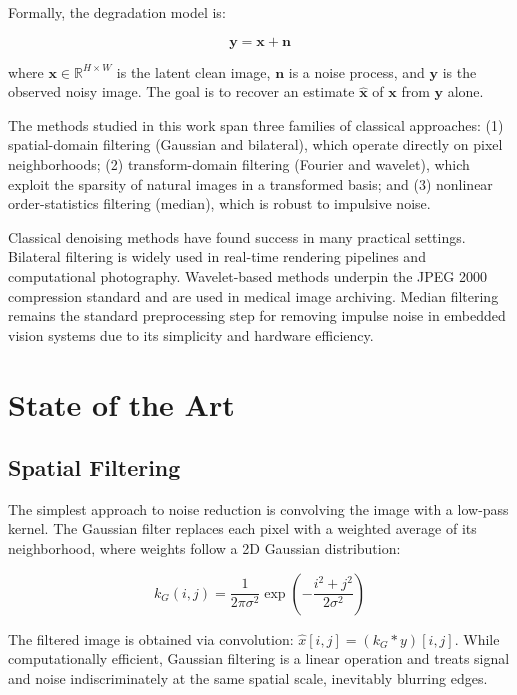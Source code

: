 \documentclass[conference]{IEEEtran}
\begin{document}
Formally, the degradation model is:

\begin{equation}
  \mathbf{y} = \mathbf{x} + \mathbf{n}
  \label{eq:degradation}
\end{equation}

where $\mathbf{x} \in \mathbb{R}^{H \times W}$ is the latent clean image, $\mathbf{n}$ is a noise process, and $\mathbf{y}$ is the observed noisy image. The goal is to recover an estimate $\hat{\mathbf{x}}$ of $\mathbf{x}$ from $\mathbf{y}$ alone.

The methods studied in this work span three families of classical approaches: (1) spatial-domain filtering (Gaussian and bilateral), which operate directly on pixel neighborhoods; (2) transform-domain filtering (Fourier and wavelet), which exploit the sparsity of natural images in a transformed basis; and (3) nonlinear order-statistics filtering (median), which is robust to impulsive noise.

Classical denoising methods have found success in many practical settings. Bilateral filtering is widely used in real-time rendering pipelines and computational photography. Wavelet-based methods underpin the JPEG 2000 compression standard and are used in medical image archiving. Median filtering remains the standard preprocessing step for removing impulse noise in embedded vision systems due to its simplicity and hardware efficiency.

\section{State of the Art}

\subsection{Spatial Filtering}

The simplest approach to noise reduction is convolving the image with a low-pass kernel. The Gaussian filter replaces each pixel with a weighted average of its neighborhood, where weights follow a 2D Gaussian distribution:
    
\begin{equation}
  k_G(i,j) = \frac{1}{2\pi\sigma^2} \exp\!\left(-\frac{i^2 + j^2}{2\sigma^2}\right)
  \label{eq:gaussian_kernel}
\end{equation}

The filtered image is obtained via convolution: $\hat{x}[i,j] = (k_G * y)[i,j]$. While computationally efficient, Gaussian filtering is a linear operation and treats signal and noise indiscriminately at the same spatial scale, inevitably blurring edges.
\end{document}
